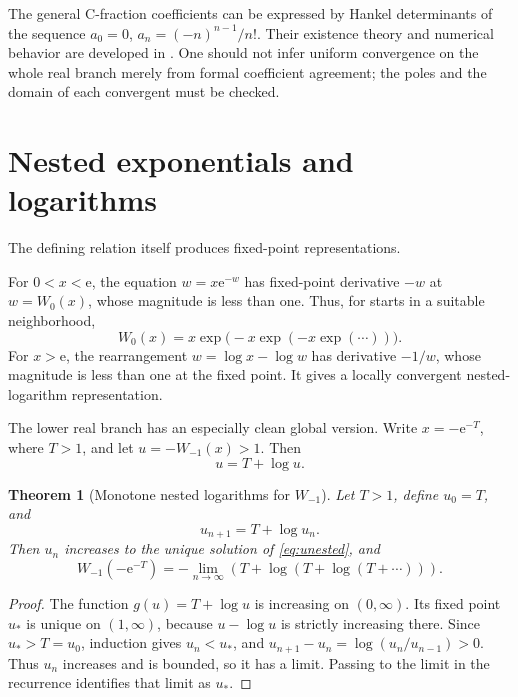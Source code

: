 \documentclass[11pt,openany]{book}
\newcommand{\e}{\mathrm{e}}
\theoremstyle{plain}
\newtheorem{theorem}{Theorem}[chapter]
\theoremstyle{definition}
\theoremstyle{remark}
\begin{document}
The general C-fraction coefficients can be expressed by Hankel determinants of
the sequence \(a_0=0\),
\(a_n=(-n)^{n-1}/n!\).  Their existence theory and numerical behavior are
developed in \cite{Corcino2018}.  One should not infer uniform convergence on
the whole real branch merely from formal coefficient agreement; the poles and
the domain of each convergent must be checked.

\section{Nested exponentials and logarithms}
The defining relation itself produces fixed-point representations.

For \(0<x<\e\), the equation \(w=x\e^{-w}\) has fixed-point derivative
\(-w\) at \(w=W_0(x)\), whose magnitude is less than one.  Thus, for starts
in a suitable neighborhood,
\begin{equation}\label{eq:nestedexp}
 W_0(x)=x\exp\bigl(-x\exp(-x\exp(\cdots))\bigr).
\end{equation}
For \(x>\e\), the rearrangement
\(w=\log x-\log w\) has derivative \(-1/w\), whose magnitude is less than
one at the fixed point.  It gives a locally convergent nested-logarithm
representation.

The lower real branch has an especially clean global version.  Write
\(x=-\e^{-T}\), where \(T>1\), and let
\(u=-W_{-1}(x)>1\).  Then
\begin{equation}\label{eq:unested}
             u=T+\log u.
\end{equation}

\begin{theorem}[Monotone nested logarithms for \(W_{-1}\)]
Let \(T>1\), define \(u_0=T\), and
\[
             u_{n+1}=T+\log u_n.
\]
Then \(u_n\) increases to the unique solution of \eqref{eq:unested}, and
\begin{equation}\label{eq:wm1nested}
 W_{-1}(-\e^{-T})
 =-\lim_{n\to\infty}
 \left(T+\log\left(T+\log\left(T+\cdots\right)\right)\right).
\end{equation}
\end{theorem}

\begin{proof}
The function \(g(u)=T+\log u\) is increasing on \((0,\infty)\).  Its fixed
point \(u_*\) is unique on \((1,\infty)\), because
\(u-\log u\) is strictly increasing there.  Since \(u_*>T=u_0\), induction
gives \(u_n<u_*\), and
\(u_{n+1}-u_n=\log(u_n/u_{n-1})>0\).  Thus \(u_n\) increases and is bounded,
so it has a limit.  Passing to the limit in the recurrence identifies that
limit as \(u_*\).
\end{proof}
\end{document}
